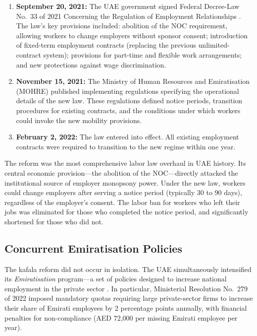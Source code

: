 \documentclass[12pt]{article}
\begin{document}
\begin{enumerate}
    \item \textbf{September 20, 2021:} The UAE government signed Federal Decree-Law No.~33 of 2021 Concerning the Regulation of Employment Relationships \citep{uaegov2021law33}. The law's key provisions included: abolition of the NOC requirement, allowing workers to change employers without sponsor consent; introduction of fixed-term employment contracts (replacing the previous unlimited-contract system); provisions for part-time and flexible work arrangements; and new protections against wage discrimination.

    \item \textbf{November 15, 2021:} The Ministry of Human Resources and Emiratisation (MOHRE) published implementing regulations specifying the operational details of the new law. These regulations defined notice periods, transition procedures for existing contracts, and the conditions under which workers could invoke the new mobility provisions.

    \item \textbf{February 2, 2022:} The law entered into effect. All existing employment contracts were required to transition to the new regime within one year.
\end{enumerate}

The reform was the most comprehensive labor law overhaul in UAE history. Its central economic provision---the abolition of the NOC---directly attacked the institutional source of employer monopsony power. Under the new law, workers could change employers after serving a notice period (typically 30 to 90 days), regardless of the employer's consent. The labor ban for workers who left their jobs was eliminated for those who completed the notice period, and significantly shortened for those who did not.

\subsection{Concurrent Emiratisation Policies}

The kafala reform did not occur in isolation. The UAE simultaneously intensified its \emph{Emiratisation} program---a set of policies designed to increase national employment in the private sector \citep{toledo2013emiratization, forstenlechner2012quotas}. In particular, Ministerial Resolution No.~279 of 2022 \citep{nafis2022resolution} imposed mandatory quotas requiring large private-sector firms to increase their share of Emirati employees by 2 percentage points annually, with financial penalties for non-compliance (AED 72,000 per missing Emirati employee per year).
\end{document}
